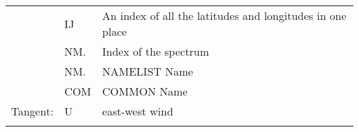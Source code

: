 \begin{longtable}[]{@{}lll@{}}
\begin{minipage}[t]{0.30\columnwidth}\raggedright
\strut
\end{minipage} & \begin{minipage}[t]{0.30\columnwidth}\raggedright
IJ\strut
\end{minipage} & \begin{minipage}[t]{0.30\columnwidth}\raggedright
An index of all the latitudes and longitudes in one place\strut
\end{minipage}\tabularnewline
\begin{minipage}[t]{0.30\columnwidth}\raggedright
\strut
\end{minipage} & \begin{minipage}[t]{0.30\columnwidth}\raggedright
NM.\strut
\end{minipage} & \begin{minipage}[t]{0.30\columnwidth}\raggedright
Index of the spectrum\strut
\end{minipage}\tabularnewline
\begin{minipage}[t]{0.30\columnwidth}\raggedright
\strut
\end{minipage} & \begin{minipage}[t]{0.30\columnwidth}\raggedright
NM.\strut
\end{minipage} & \begin{minipage}[t]{0.30\columnwidth}\raggedright
NAMELIST Name\strut
\end{minipage}\tabularnewline
\begin{minipage}[t]{0.30\columnwidth}\raggedright
\strut
\end{minipage} & \begin{minipage}[t]{0.30\columnwidth}\raggedright
COM\strut
\end{minipage} & \begin{minipage}[t]{0.30\columnwidth}\raggedright
COMMON Name\strut
\end{minipage}\tabularnewline
\begin{minipage}[t]{0.30\columnwidth}\raggedright
Tangent:\strut
\end{minipage} & \begin{minipage}[t]{0.30\columnwidth}\raggedright
U\strut
\end{minipage} & \begin{minipage}[t]{0.30\columnwidth}\raggedright
east-west wind\strut
\end{minipage}\tabularnewline
\begin{minipage}[t]{0.30\columnwidth}\raggedright

\end{minipage}
\end{longtable}
